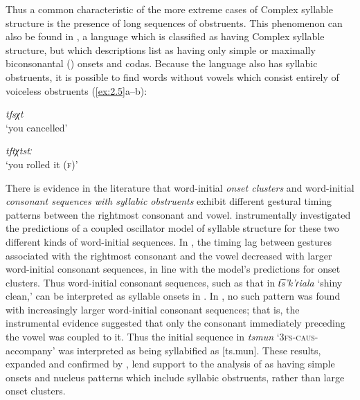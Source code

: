   Thus a common characteristic of the more extreme cases of Complex syllable structure is the presence of long sequences of obstruents. This phenomenon can also be found in , a language which is classified as having Complex syllable structure, but which descriptions list as having only simple \citep{Ridouane2008} or maximally biconsonantal (\citealt{PuechLouali1999}) onsets and codas. Because the language also has syllabic obstruents, it is possible to find words without vowels which consist entirely of voiceless obstruents (\ref{ex:2.5}a--b):

\ea\label{ex:2.5}
\ea  \textit{tfsχt}\\
\glt ‘you cancelled’

\ex  \textit{tftχtstː}\\
\glt ‘you rolled it (\textsc{f})’

  \citep[95]{Ridouane2002}
\z
\z

  There is evidence in the literature that word-initial \textit{onset clusters} and word-initial \textit{consonant sequences with syllabic obstruents} exhibit different gestural timing patterns between the rightmost consonant and vowel. \citet{GoldsteinEtAl2007} instrumentally investigated the predictions of a coupled oscillator model of syllable structure for these two different kinds of word-initial sequences. In , the timing lag between gestures associated with the rightmost consonant and the vowel decreased with larger word-initial consonant sequences, in line with the model’s predictions for onset clusters. Thus word-initial consonant sequences, such as that in \textit{t͡s’k’ɾiala} ‘shiny clean,’ can be interpreted as syllable onsets in . In , no such pattern was found with increasingly larger word-initial consonant sequences; that is, the instrumental evidence suggested that only the consonant immediately preceding the vowel was coupled to it. Thus the initial sequence in \textit{tsmun} ‘\textsc{3fs}-\textsc{caus}-accompany’ was interpreted as being syllabified as [ts.mun]. These results, expanded and confirmed by \citet{HermesEtAl2011}, lend support to the analysis of  as having simple onsets and nucleus patterns which include syllabic obstruents, rather than large onset clusters.

